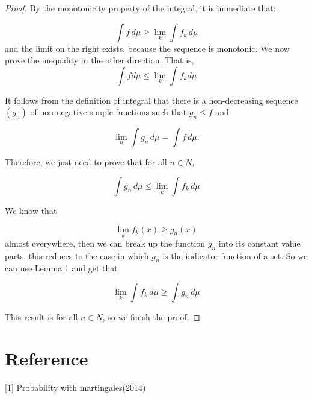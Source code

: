 \documentclass[12pt]{article}
\theoremstyle{mythm}
\begin{document}
\begin{proof}

By the monotonicity property of the integral, it is immediate that:

$$\displaystyle \int f\,d\mu \geq \lim _{k}\int f_{k}\,d\mu$$
and the limit on the right exists, because the sequence is monotonic. We now prove the inequality in the other direction. That is,
$$\int fd\mu \leq \lim _{k}\int f_{k}d\mu$$

It follows from the definition of integral that there is a non-decreasing sequence $(g_n)$ of non-negative simple functions such that $g_n \leq f$ and

$$\displaystyle \lim _{n}\int g_{n}\,d\mu =\int f\,d\mu .$$

Therefore, we just need to prove that for all $n \in N$,

$$\displaystyle \int g_{n}\,d\mu \leq \lim _{k}\int f_{k}\,d\mu$$

We know that

$$\lim _{k}f_{k}(x)\geq g_n(x)$$
almost everywhere, then we can break up the function $g_n$ into its constant value parts, this reduces to the case in which $g_n$ is the indicator function of a set. So we can use Lemma 1 and get that

$$\lim _{k}\int f_{k}\,d\mu \geq \int g_n\,d\mu$$

This result is for all $n \in N$, so we finish the proof.

\end{proof} 

\section*{Reference}
	[1] Probability with martingales(2014)
\end{document}
